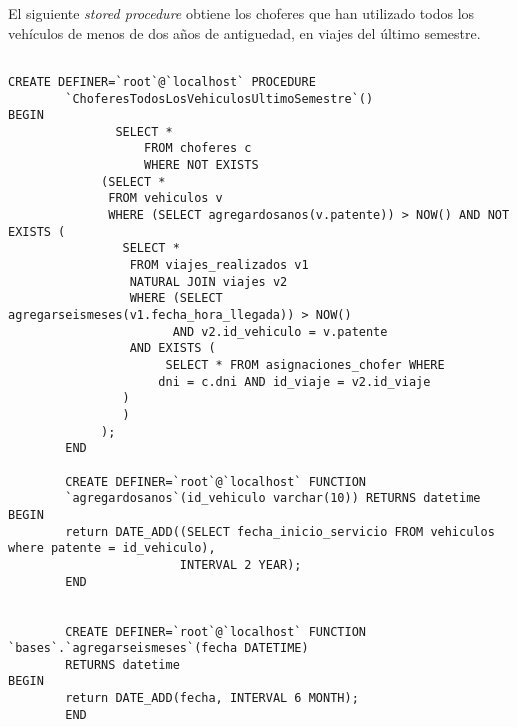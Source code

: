 El siguiente \textit{stored procedure} obtiene los choferes que han utilizado todos los veh\'iculos de menos de dos a\~nos 
de antiguedad, en viajes del \'ultimo semestre.

\begin{verbatim}
		
CREATE DEFINER=`root`@`localhost` PROCEDURE  
		`ChoferesTodosLosVehiculosUltimoSemestre`()
BEGIN
		       SELECT *
	       	       FROM choferes c
	       	       WHERE NOT EXISTS
			 (SELECT *
			  FROM vehiculos v
			  WHERE (SELECT agregardosanos(v.patente)) > NOW() AND NOT EXISTS (
				SELECT *
				 FROM viajes_realizados v1
				 NATURAL JOIN viajes v2
				 WHERE (SELECT agregarseismeses(v1.fecha_hora_llegada)) > NOW()
				       AND v2.id_vehiculo = v.patente
				 AND EXISTS (
				      SELECT * FROM asignaciones_chofer WHERE
					 dni = c.dni AND id_viaje = v2.id_viaje
				)      
				) 
			 );
		END
		
		CREATE DEFINER=`root`@`localhost` FUNCTION  
		`agregardosanos`(id_vehiculo varchar(10)) RETURNS datetime
BEGIN
		return DATE_ADD((SELECT fecha_inicio_servicio FROM vehiculos where patente = id_vehiculo), 
						INTERVAL 2 YEAR);
		END
		

		CREATE DEFINER=`root`@`localhost` FUNCTION  `bases`.`agregarseismeses`(fecha DATETIME) 
		RETURNS datetime
BEGIN
		return DATE_ADD(fecha, INTERVAL 6 MONTH);
		END
		
		
\end{verbatim}

